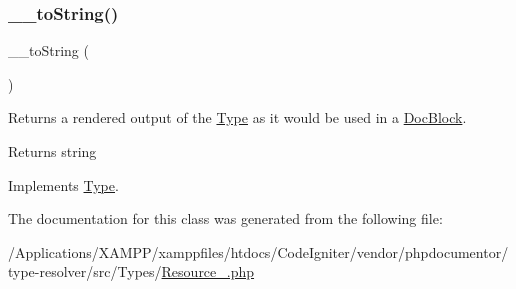 \subsubsection{\texorpdfstring{\+\_\+\+\_\+to\+String()}{\_\_toString()}}
{\footnotesize\ttfamily \+\_\+\+\_\+to\+String (\begin{DoxyParamCaption}{ }\end{DoxyParamCaption})}

Returns a rendered output of the \mbox{\hyperlink{interfacephp_documentor_1_1_reflection_1_1_type}{Type}} as it would be used in a \mbox{\hyperlink{classphp_documentor_1_1_reflection_1_1_doc_block}{Doc\+Block}}.

\begin{DoxyReturn}{Returns}
string 
\end{DoxyReturn}


Implements \mbox{\hyperlink{interfacephp_documentor_1_1_reflection_1_1_type_a7516ca30af0db3cdbf9a7739b48ce91d}{Type}}.



The documentation for this class was generated from the following file\+:\begin{DoxyCompactItemize}
\item 
/\+Applications/\+X\+A\+M\+P\+P/xamppfiles/htdocs/\+Code\+Igniter/vendor/phpdocumentor/type-\/resolver/src/\+Types/\mbox{\hyperlink{_resource___8php}{Resource\+\_\+.\+php}}\end{DoxyCompactItemize}

